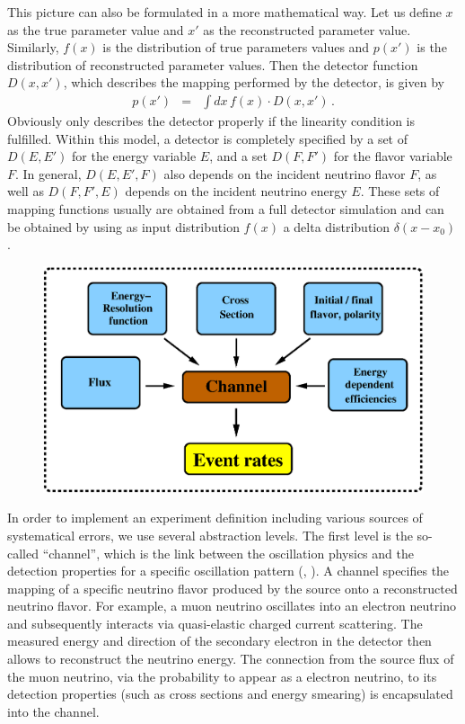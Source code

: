 This picture can also be formulated in a more mathematical way. Let us define $x$ as the true parameter value and $x'$ as the reconstructed parameter value. Similarly, $f(x)$ is the distribution of true parameters values and $p(x')$ is the distribution of reconstructed parameter values. Then the detector function  $D(x,x')$, which describes the mapping performed by the detector, is given by
\begin{eqnarray}
\label{equ:mapping}
p(x')&=&\int dx\, f(x)\cdot D(x,x')\,.
\end{eqnarray}
Obviously  only describes the detector properly
if the linearity condition is fulfilled. Within this model, a detector
is completely specified by a set of $D(E,E')$ for the energy variable $E$,
and a set $D(F,F')$ for the flavor variable $F$. In general, $D(E,E',F)$ also depends on the incident neutrino flavor $F$, as well as $D(F,F',E)$ depends on the incident neutrino energy $E$. These sets of mapping functions usually are obtained from a 
full detector simulation and can be obtained by using as input 
distribution $f(x)$ a delta distribution $\delta(x-x_0)$.

\begin{figure}[t]
\begin{center}
\includegraphics[width=13cm]{AEDL1}
\end{center}
\end{figure}

In order to implement an experiment definition including various
sources of systematical errors, we use several abstraction levels. 
The first level is the so-called ``channel'', 
 which is the link between 
the oscillation physics and the detection properties for a specific oscillation pattern (\cf, ). A channel specifies the mapping of a specific neutrino flavor produced by the source onto a reconstructed neutrino flavor.
For example, a muon neutrino oscillates into an electron neutrino and subsequently interacts via quasi-elastic charged current scattering. The measured energy and direction of
the secondary electron in the detector then allows to reconstruct the neutrino energy. The connection from the source flux of the muon neutrino, via the  probability to appear as a electron neutrino, to its detection properties (such as cross sections and energy smearing) is encapsulated into the channel.

